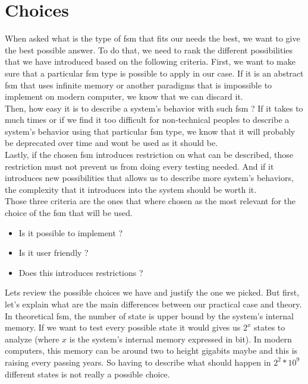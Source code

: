 \documentclass[12pt]{article}
\theoremstyle{definition}
\theoremstyle{definition}
\begin{document}
\section{Choices}

When asked what is the type of \gls{fsm} that fits our needs the best, we want to give the best possible answer. To do that, we need to rank the different possibilities that we have introduced based on the following criteria. First, we want to make sure that a particular \gls{fsm} type is possible to apply in our case. If it is an abstract \gls{fsm} that uses infinite memory or another paradigms that is impossible to implement on modern computer, we know that we can discard it.\\

Then, how easy it is to describe a system's behavior with such \gls{fsm} ? If it takes to much times or if we find it too difficult for non-technical peoples to describe a system's behavior using that particular \gls{fsm} type, we know that it will probably be deprecated over time and wont be used as it should be.\\

Lastly, if the chosen \gls{fsm} introduces restriction on what can be described, those restriction must not prevent us from doing every testing needed. And if it introduces new possibilities that allows us to describe more system's behaviors, the complexity that it introduces into the system should be worth it.\\

Those three criteria are the ones that where chosen as the most relevant for the choice of the \gls{fsm} that will be used.

\begin{itemize}
\item Is it possible to implement ?
\item Is it user friendly ?
\item Does this introduces restrictions ?
\end{itemize}

Lets review the possible choices we have and justify the one we picked. But first, let's explain what are the main differences between our practical case and theory. In theoretical \gls{fsm}, the number of state is upper bound by the system's internal memory. If we want to test every possible state it would gives us $2^x$ states to analyze (where $x$ is the system's internal memory expressed in bit). In modern computers, this memory can be around two to height gigabits maybe and this is raising every passing years. So having to describe what should happen in $2^2*10^9$ different states is not really a possible choice.\\
\end{document}
